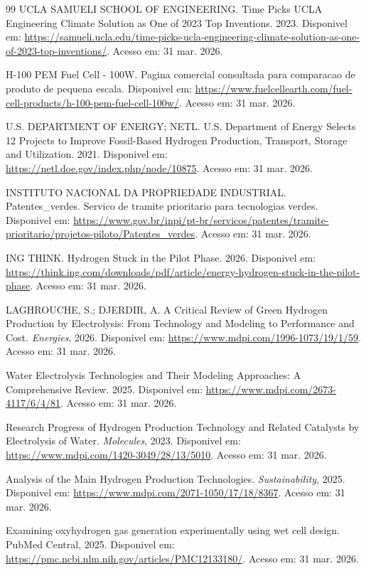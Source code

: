 \documentclass[12pt,oneside,a4paper,english,brazilian]{abntex2}
\begin{document}
\begin{thebibliography}{99}
UCLA SAMUELI SCHOOL OF ENGINEERING. Time Picks UCLA Engineering Climate Solution as One of 2023 Top Inventions. 2023. Disponivel em: \url{https://samueli.ucla.edu/time-picks-ucla-engineering-climate-solution-as-one-of-2023-top-inventions/}. Acesso em: 31 mar. 2026.

H-100 PEM Fuel Cell - 100W. Pagina comercial consultada para comparacao de produto de pequena escala. Disponivel em: \url{https://www.fuelcellearth.com/fuel-cell-products/h-100-pem-fuel-cell-100w/}. Acesso em: 31 mar. 2026.

U.S. DEPARTMENT OF ENERGY; NETL. U.S. Department of Energy Selects 12 Projects to Improve Fossil-Based Hydrogen Production, Transport, Storage and Utilization. 2021. Disponivel em: \url{https://netl.doe.gov/index.php/node/10875}. Acesso em: 31 mar. 2026.

INSTITUTO NACIONAL DA PROPRIEDADE INDUSTRIAL. Patentes\_verdes. Servico de tramite prioritario para tecnologias verdes. Disponivel em: \url{https://www.gov.br/inpi/pt-br/servicos/patentes/tramite-prioritario/projetos-piloto/Patentes_verdes}. Acesso em: 31 mar. 2026.

ING THINK. Hydrogen Stuck in the Pilot Phase. 2026. Disponivel em: \url{https://think.ing.com/downloads/pdf/article/energy-hydrogen-stuck-in-the-pilot-phase}. Acesso em: 31 mar. 2026.

LAGHROUCHE, S.; DJERDIR, A. A Critical Review of Green Hydrogen Production by Electrolysis: From Technology and Modeling to Performance and Cost. \textit{Energies}, 2026. Disponivel em: \url{https://www.mdpi.com/1996-1073/19/1/59}. Acesso em: 31 mar. 2026.

Water Electrolysis Technologies and Their Modeling Approaches: A Comprehensive Review. 2025. Disponivel em: \url{https://www.mdpi.com/2673-4117/6/4/81}. Acesso em: 31 mar. 2026.

Research Progress of Hydrogen Production Technology and Related Catalysts by Electrolysis of Water. \textit{Molecules}, 2023. Disponivel em: \url{https://www.mdpi.com/1420-3049/28/13/5010}. Acesso em: 31 mar. 2026.

Analysis of the Main Hydrogen Production Technologies. \textit{Sustainability}, 2025. Disponivel em: \url{https://www.mdpi.com/2071-1050/17/18/8367}. Acesso em: 31 mar. 2026.

Examining oxyhydrogen gas generation experimentally using wet cell design. PubMed Central, 2025. Disponivel em: \url{https://pmc.ncbi.nlm.nih.gov/articles/PMC12133180/}. Acesso em: 31 mar. 2026.


\end{thebibliography}
\end{document}
